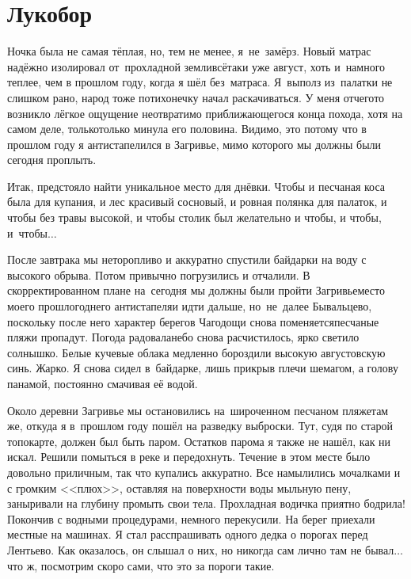 \chapter{Лукобор} 
\vepsianrose

\vspace{5mm}
Ночка была не самая тёплая, но, тем не менее, я~не~замёрз. Новый матрас надёжно изолировал от~прохладной земли\mdash всё\sdash таки уже август, хоть и~намного теплее, чем в прошлом году, когда я шёл без~матраса. Я~выполз из~палатки не слишком рано, народ тоже потихонечку начал раскачиваться. У меня отчего\sdash то возникло лёгкое ощущение неотвратимо приближающегося конца похода, хотя на самом деле, только\sdash только минула его половина. Видимо, это потому что в прошлом году я антистапелился в Загривье, мимо которого мы должны были сегодня проплыть. 
 
Итак, предстояло найти уникальное место для днёвки. Чтобы и песчаная коса была для купания, и лес красивый сосновый, и ровная полянка для палаток, и чтобы без травы высокой, и чтобы столик был желательно и чтобы, и чтобы, и~чтобы$\ldots$  

\newpage
После завтрака мы неторопливо и аккуратно спустили байдарки на воду с высокого обрыва. Потом привычно погрузились и отчалили. В скорректированном плане на~сегодня мы должны были пройти Загривье\mdash место моего прошлогоднего антистапеля\mdash и идти дальше, но~не~далее Бывальцево, поскольку после него характер берегов Чагодощи снова поменяется\mdash песчаные пляжи пропадут. Погода радовала\mdash небо снова расчистилось, ярко светило солнышко. Белые кучевые облака медленно бороздили высокую августовскую синь. Жарко. Я снова сидел в~байдарке, лишь прикрыв плечи шемагом, а голову панамой, постоянно смачивая её водой. 

Около деревни Загривье мы остановились на~широченном песчаном пляже\mdash там же, откуда я в~прошлом году пошёл на разведку выброски. Тут, судя по старой топокарте, должен был быть паром. Остатков парома я также не нашёл, как ни искал. Решили помыться в реке и передохнуть. Течение в этом месте было довольно приличным, так что купались аккуратно. Все намылились мочалками и с громким <<плюх>>, оставляя на поверхности воды мыльную пену, заныривали на глубину промыть свои тела. Прохладная водичка приятно бодрила! Покончив с водными процедурами, немного перекусили. На берег приехали местные на машинах. Я стал расспрашивать одного дедка о порогах перед Лентьево. Как оказалось, он слышал о них, но никогда сам лично там не бывал$\ldots$ что ж, посмотрим скоро сами, что это за пороги такие. 

